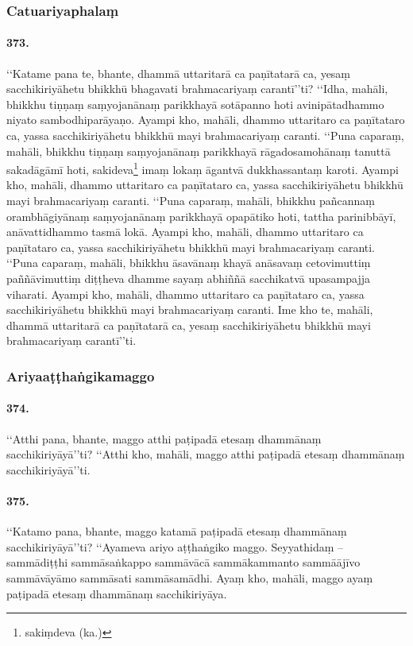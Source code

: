 \subsubsection{Catuariyaphalaṃ}

\paragraph{373.} ‘‘Katame pana te, bhante, dhammā uttaritarā ca paṇītatarā ca, yesaṃ sacchikiriyāhetu bhikkhū bhagavati brahmacariyaṃ carantī’’ti? ‘‘Idha, mahāli, bhikkhu tiṇṇaṃ saṃyojanānaṃ parikkhayā sotāpanno hoti avinipātadhammo niyato sambodhiparāyaṇo. Ayampi kho, mahāli, dhammo uttaritaro ca paṇītataro ca, yassa sacchikiriyāhetu bhikkhū mayi brahmacariyaṃ caranti. ‘‘Puna caparaṃ, mahāli, bhikkhu tiṇṇaṃ saṃyojanānaṃ parikkhayā rāgadosamohānaṃ tanuttā sakadāgāmī hoti, sakideva\footnote{sakiṃdeva (ka.)} imaṃ lokaṃ āgantvā dukkhassantaṃ karoti. Ayampi kho, mahāli, dhammo uttaritaro ca paṇītataro ca, yassa sacchikiriyāhetu bhikkhū mayi brahmacariyaṃ caranti. ‘‘Puna caparaṃ, mahāli, bhikkhu pañcannaṃ orambhāgiyānaṃ saṃyojanānaṃ parikkhayā opapātiko hoti, tattha parinibbāyī, anāvattidhammo tasmā lokā. Ayampi kho, mahāli, dhammo uttaritaro ca paṇītataro ca, yassa sacchikiriyāhetu bhikkhū mayi brahmacariyaṃ caranti. ‘‘Puna caparaṃ, mahāli, bhikkhu āsavānaṃ khayā anāsavaṃ cetovimuttiṃ paññāvimuttiṃ diṭṭheva dhamme sayaṃ abhiññā sacchikatvā upasampajja viharati. Ayampi kho, mahāli, dhammo uttaritaro ca paṇītataro ca, yassa sacchikiriyāhetu bhikkhū mayi brahmacariyaṃ caranti. Ime kho te, mahāli, dhammā uttaritarā ca paṇītatarā ca, yesaṃ sacchikiriyāhetu bhikkhū mayi brahmacariyaṃ carantī’’ti.

\subsubsection{Ariyaaṭṭhaṅgikamaggo}

\paragraph{374.} ‘‘Atthi pana, bhante, maggo atthi paṭipadā etesaṃ dhammānaṃ sacchikiriyāyā’’ti? ‘‘Atthi kho, mahāli, maggo atthi paṭipadā etesaṃ dhammānaṃ sacchikiriyāyā’’ti.

\paragraph{375.} ‘‘Katamo pana, bhante, maggo katamā paṭipadā etesaṃ dhammānaṃ sacchikiriyāyā’’ti? ‘‘Ayameva ariyo aṭṭhaṅgiko maggo. Seyyathidaṃ – sammādiṭṭhi sammāsaṅkappo sammāvācā sammākammanto sammāājīvo sammāvāyāmo sammāsati sammāsamādhi. Ayaṃ kho, mahāli, maggo ayaṃ paṭipadā etesaṃ dhammānaṃ sacchikiriyāya.

